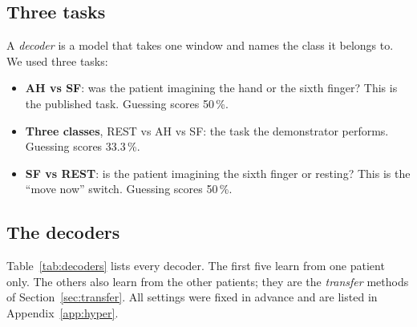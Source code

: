 \subsection{Three tasks}
A \emph{decoder} is a model that takes one window and names the class it belongs to. We
used three tasks:
\begin{itemize}
  \item \textbf{AH vs SF}: was the patient imagining the hand or the sixth finger? This is
  the published task. Guessing scores 50\,\%.
  \item \textbf{Three classes}, REST vs AH vs SF: the task the demonstrator performs.
  Guessing scores 33.3\,\%.
  \item \textbf{SF vs REST}: is the patient imagining the sixth finger or resting? This is
  the ``move now'' switch. Guessing scores 50\,\%.
\end{itemize}

\subsection{The decoders}
Table~\ref{tab:decoders} lists every decoder. The first five learn from one patient only.
The others also learn from the other patients; they are the \emph{transfer} methods of
Section~\ref{sec:transfer}. All settings were fixed in advance and are listed in
Appendix~\ref{app:hyper}.

